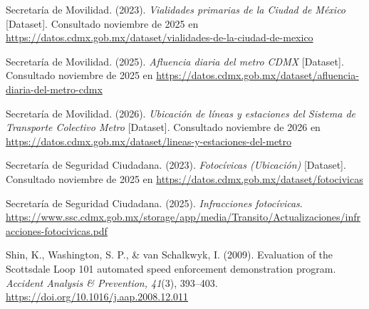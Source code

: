 \begin{thebibliography}{}
Secretaría de Movilidad. (2023). \textit{Vialidades primarias de la Ciudad de México} [Dataset]. Consultado noviembre de 2025 en \url{https://datos.cdmx.gob.mx/dataset/vialidades-de-la-ciudad-de-mexico}

Secretaría de Movilidad. (2025). \textit{Afluencia diaria del metro CDMX} [Dataset]. Consultado noviembre de 2025 en \url{https://datos.cdmx.gob.mx/dataset/afluencia-diaria-del-metro-cdmx}

Secretaría de Movilidad. (2026). \textit{Ubicación de líneas y estaciones del Sistema de Transporte Colectivo Metro} [Dataset]. Consultado noviembre de 2026 en \url{https://datos.cdmx.gob.mx/dataset/lineas-y-estaciones-del-metro}

Secretaría de Seguridad Ciudadana. (2023). \textit{Fotoc\'ivicas (Ubicación)} [Dataset]. Consultado noviembre de 2025 en \url{https://datos.cdmx.gob.mx/dataset/fotocivicas}

Secretaría de Seguridad Ciudadana. (2025). \textit{Infracciones fotocívicas}. \url{https://www.ssc.cdmx.gob.mx/storage/app/media/Transito/Actualizaciones/infracciones-fotocivicas.pdf}

Shin, K., Washington, S. P., \& van Schalkwyk, I. (2009). Evaluation of the Scottsdale Loop 101 automated speed enforcement demonstration program. \textit{Accident Analysis \& Prevention, 41}(3), 393–403. \url{https://doi.org/10.1016/j.aap.2008.12.011}

\end{thebibliography}
